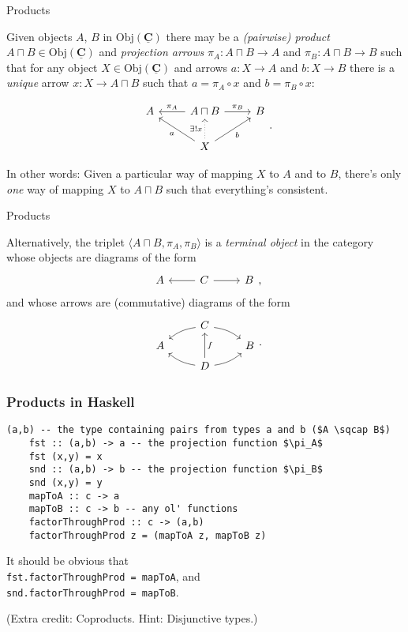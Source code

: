 \documentclass[10pt]{beamer}
\newcommand{\Cat}[1]{\ensuremath{\underline{\mathbf{#1}}}}
\newcommand{\Obj}[1]{\ensuremath{\mathrm{Obj}(\Cat{#1})}}
\theoremstyle{definition}
\theoremstyle{remark}
\numberwithin{equation}{section}
\begin{document}
\begin{frame}[fragile]{Products}

  Given objects $A$, $B$ in $\Obj{C}$ there may be a \emph{(pairwise) product}
  $A\sqcap B \in \Obj{C}$ and \emph{projection arrows} $\pi_A \colon A \sqcap B \rightarrow A$ and $\pi_B
  \colon A \sqcap B \rightarrow B$ such that for any object $X \in \Obj{C}$ and arrows $a \colon X \rightarrow
  A$ and $b \colon X \rightarrow B$ there is a \emph{unique} arrow $x : X \rightarrow A \sqcap B$ such that $a = \pi_A \circ x$ and $b = \pi_B \circ x$:

  \[
  \begin{tikzcd}
    A & A\sqcap B \arrow[swap]{l}{\pi_{A}} \arrow{r}{\pi_{B}} & B \\
    & X \arrow[dotted]{u}{\exists! x} \arrow{ul}{a} \arrow[swap]{ur}{b} & 
  \end{tikzcd}\rlap{.}
  \]

  In other words: Given a particular way of mapping $X$ to $A$ and to $B$, there's only \emph{one} way of mapping $X$ to $A \sqcap B$ such that everything's consistent.

\end{frame}

\begin{frame}[fragile]{Products}

  Alternatively, the triplet $\langle {A \sqcap B, \pi_A, \pi_B} \rangle$ is a \emph{terminal object}
  in the category whose objects are diagrams of the form
  \[
    \begin{tikzcd}
      A & C \arrow{l} \arrow{r} & B
    \end{tikzcd}\rlap{,}
  \]
  and whose arrows are (commutative) diagrams of the form
  \[
    \begin{tikzcd}[row sep=tiny]
       & C \arrow[bend right=15]{dl} \arrow[bend left=15]{dr} & \\
      A & & B \\
       & D \arrow[bend left=15]{ul} \arrow[swap]{uu}{f} \arrow[bend right=15]{ur} & 
    \end{tikzcd}\rlap{.}
  \]

\end{frame}

\begin{frame}[fragile]
  \frametitle{Products in Haskell}
  \begin{lstlisting}[frame=single,mathescape=true]
    (a,b) -- the type containing pairs from types a and b ($A \sqcap B$)
    fst :: (a,b) -> a -- the projection function $\pi_A$
    fst (x,y) = x
    snd :: (a,b) -> b -- the projection function $\pi_B$
    snd (x,y) = y
    mapToA :: c -> a
    mapToB :: c -> b -- any ol' functions
    factorThroughProd :: c -> (a,b)
    factorThroughProd z = (mapToA z, mapToB z)
  \end{lstlisting}

  It should be obvious that\\
  \lstinline{fst.factorThroughProd = mapToA}, and\\
  \lstinline{snd.factorThroughProd = mapToB}.
  
  {\footnotesize (Extra credit: Coproducts. Hint: Disjunctive types.)}
\end{frame}
\end{document}
